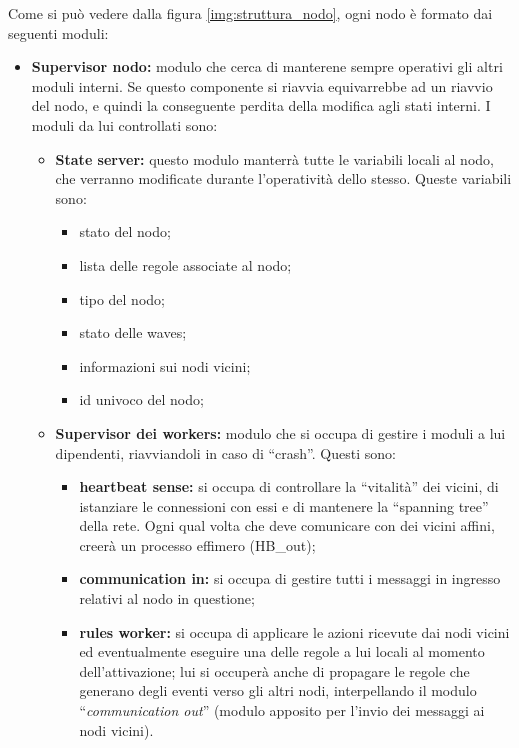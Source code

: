 \documentclass[italian]{memoir}
\begin{document}
Come si può vedere dalla figura \ref{img:struttura_nodo}, ogni nodo è formato dai
	   seguenti moduli:
\begin{itemize}
	\item \textbf{Supervisor nodo:} modulo che cerca di manterene sempre operativi gli
	   altri moduli interni. Se questo componente si riavvia equivarrebbe ad un riavvio
	   del nodo, e quindi la conseguente perdita della modifica agli stati interni.
	   I moduli
	   da lui controllati sono:
	\begin{itemize}
	\item \textbf{State server:} questo modulo manterrà tutte le variabili locali al
	   nodo, che verranno modificate durante l'operatività dello stesso. Queste variabili
	   sono:
		\begin{itemize}
		\item stato del nodo;
		\item lista delle regole associate al nodo;
		\item tipo del nodo;
		\item stato delle waves; %
		\item informazioni sui nodi vicini;
		\item id univoco del nodo;
		\end{itemize}
	\item \textbf{Supervisor dei workers:} modulo che si occupa di gestire i moduli
	   a lui dipendenti, riavviandoli in caso di ``crash''. Questi sono:
		\begin{itemize}
		\item \textbf{heartbeat sense:} si occupa di controllare la ``vitalità'' dei vicini,
	     di istanziare le connessioni con essi e di mantenere la ``spanning tree'' della rete.
	     Ogni qual volta che deve comunicare con dei vicini affini, creerà un processo effimero
	     (HB\_out);
		\item \textbf{communication in:} si occupa di gestire tutti i messaggi in ingresso
	   relativi al nodo in questione;
		\item \textbf{rules worker:} si occupa di applicare le azioni ricevute dai nodi
	   vicini ed eventualmente eseguire una delle regole a lui locali al momento dell'attivazione;
	   lui si occuperà anche di propagare le regole che generano degli eventi verso
	   gli
	   altri nodi, interpellando il modulo ``\textit{communication out}'' 
	  (modulo apposito per l'invio dei messaggi ai nodi vicini).
		\end{itemize}
	\end{itemize}
\end{itemize}
\end{document}

